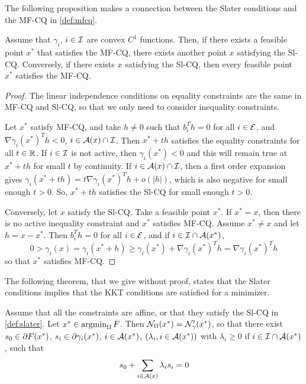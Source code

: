 The following proposition makes a connection between the Slater conditions and the MF-CQ in \cref{def:mfcq}.
\begin{proposition}
\label{prop:mf.sl}
Assume  that $\gamma_i$, $i\in {\mathcal I}$ are convex $C^1$ functions. Then, if there exists a feasible point $x^*$  that satisfies the MF-CQ, there exists another point $x$ satisfying the Sl-CQ. Conversely, if there exists $x$ satisfying the Sl-CQ, then every feasible point $x^*$ satisfies the MF-CQ.
\end{proposition}
\begin{proof}
The linear independence conditions on equality constraints are the same in MF-CQ and Sl-CQ, so that we only need to consider inequality constraints.

Let $x^*$ satisfy MF-CQ, and take $h\neq 0$ such that $b_i^Th = 0$ for all $i\in{\mathcal E}$, and $\nabla \gamma_i(x^*)^Th < 0$, $i\in{\mathcal A}(x)\cap{\mathcal I}$. Then $x^* + th$ satisfies the equality constraints for all $t\in {\mathbb{R}}$. If $i\in {\mathcal I}$ is not active, then  $\gamma_i(x^*) < 0$ and this will remain true at $x^*+th$ for small $t$ by continuity. If $i\in {\mathcal A}(x)\cap{\mathcal I}$, then a first order expansion gives $\gamma_i(x^*+th) = t\nabla \gamma_i(x^*)^T h + o(|h|)$, which is also negative for small enough $t>0$. So, $x^*+th$ satisfies the Sl-CQ for small enough $t>0$. 

Conversely, let $x$ satisfy the Sl-CQ. Take a feasible point $x^*$. If $x^* = x$, then there is no active inequality constraint and $x^*$ satisfies MF-CQ. Assume $x^*\neq x$ and let $h = x-x^*$. Then $b_i^T h = 0$ for all $i\in{\mathcal E}$, and if $i\in {\mathcal I}\cap {\mathcal A}(x^*)$, 
\[
0 > \gamma_i(x) = \gamma_i(x^* + h) \geq \gamma_i(x^*) + \nabla \gamma_i(x^*)^Th = \nabla \gamma_i(x^*)^Th
\]
so that $x^*$ satisfies MF-CQ.
\end{proof}

The following theorem, that we give without proof, states that the Slater conditions implies that the KKT conditions are satisfied for a minimizer.
\begin{theorem}
\label{th:kkt.convex}
Assume that all the constraints are affine, or that they satisfy the Sl-CQ in \cref{def:slater}. Let $x^*\in \operatorname*{argmin}_\Omega F$. 
Then ${\mathcal N}_\Omega(x^*) = {\mathcal N}'_\gamma(x^*)$, so that there exist $s_0\in \partial F(x^*)$, $s_i\in \partial\gamma_i(x^*)$, $i\in {\mathcal A}(x^*)$, $(\lambda_i, i\in {\mathcal A}(x^*))$ with $\lambda_i \geq 0 $ if $i\in {\mathcal I}\cap {\mathcal A}(x^*)$, such that
\begin{equation}
\label{eq:kkt.convex}
s_0 + \sum_{i\in{\mathcal A}(x)} \lambda_i s_i = 0
\end{equation}
\end{theorem} 

